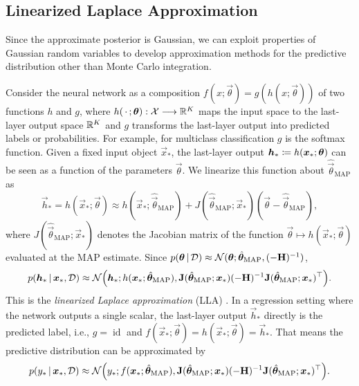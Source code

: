 \subsection{Linearized Laplace Approximation}

Since the approximate posterior is Gaussian, we can exploit properties of Gaussian random variables to develop approximation methods for the predictive distribution other than Monte Carlo integration.

Consider the neural network as a composition $f(x; \vec{\theta}) = g(h(x; \vec{\theta}))$ of two functions $h$ and $g$, where $h(\,\cdot\,; \bm{\theta}): \mathcal{X} \longrightarrow \mathbb{R}^K$ maps the input space to the last-layer output space $\mathbb{R}^K$ and $g$ transforms the last-layer output into predicted labels or probabilities. For example, for multiclass classification $g$ is the softmax function. Given a fixed input object $\vec{x}_*$, the last-layer output $\bm{h}_* \coloneqq h(\bm{x}_*; \bm{\theta})$ can be seen as a function of the parameters $\vec{\theta}$. We linearize this function about $\hat{\vec{\theta}}_\text{MAP}$ as
\begin{equation} \label{eq:linearize}
  \vec{h}_* = h(\vec{x}_*; \vec{\theta}) \approx h(\vec{x}_*; \hat{\vec{\theta}}_\text{MAP}) + J(\hat{\vec{\theta}}_\text{MAP}; \vec{x}_*) (\vec{\theta} - \hat{\vec{\theta}}_\text{MAP}),
\end{equation}
where $J(\hat{\vec{\theta}}_\text{MAP}; \vec{x}_*)$ denotes the Jacobian matrix of the function $\vec{\theta} \mapsto h(\vec{x}_*; \vec{\theta})$ evaluated at the MAP estimate. Since $p(\bm{\theta} \,|\, \mathcal{D}) \approx \mathcal{N}( \bm{\theta}; \hat{\bm{\theta}}_\text{MAP}, (- \bm{\mathbf{H}})^{-1} )$,
\begin{equation} \label{eq:lla}
  p(\vec{h}_* \given \vec{x}_*, \mathcal{D}) \approx \mathcal{N}\mleft( \vec{h}_*;  h(\vec{x}_*; \hat{\vec{\theta}}_\text{MAP}), \mat{J}(\hat{\vec{\theta}}_\text{MAP}; \vec{x}_*) (-\mat{H})^{-1} \mat{J}(\hat{\vec{\theta}}_\text{MAP}; \vec{x}_*)^\T  \mright).
\end{equation}
This is the \emph{linearized Laplace approximation} (LLA) \citep{immerLLA2021a}. In a regression setting where the network outputs a single scalar, the last-layer output $\vec{h}_*$ directly is the predicted label, i.e., $g = \operatorname{id}$ and $f(\vec{x}_*; \vec{\theta}) = h(\vec{x}_*; \vec{\theta}) = \vec{h}_*$. That means the predictive distribution can be approximated by
\begin{equation*}
  p(y_* \given \vec{x}_*, \mathcal{D}) \approx \mathcal{N}\mleft( y_*;  f(\vec{x}_*; \hat{\vec{\theta}}_\text{MAP}), \mat{J}(\hat{\vec{\theta}}_\text{MAP}; \vec{x}_*) (-\mat{H})^{-1} \mat{J}(\hat{\vec{\theta}}_\text{MAP}; \vec{x}_*)^\T  \mright).
\end{equation*}
